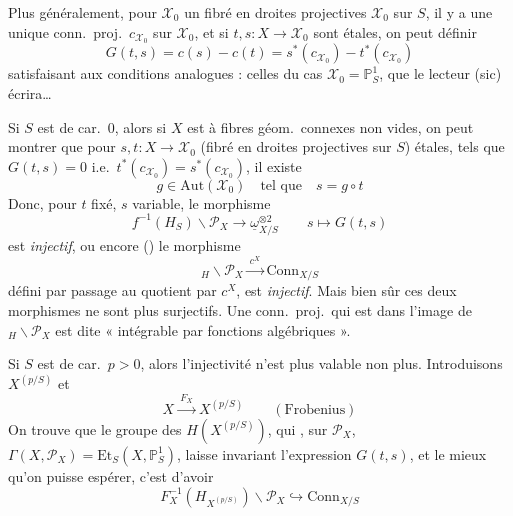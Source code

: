 \documentclass[11pt,a4paper]{article}
\begin{document}
Plus généralement, pour $\mathcal{X}_0$ un fibré en droites projectives $\mathcal{X}_0$ sur $S$, il y a une unique conn.\ proj.\ $c_{\mathcal{X}_0}$ sur $\mathcal{X}_0$, et si $t,s:X\to\mathcal{X}_0$ sont étales, on peut définir
\[
G(t,s)=c(s)-c(t)=s^*(c_{\mathcal{X}_0})-t^*(c_{\mathcal{X}_0})
\]
satisfaisant aux conditions analogues : celles du cas $\mathcal{X}_0=\mathbb{P}^1_S$, que le lecteur (sic) écrira…

Si $S$ est de car.\ $0$, alors si $X$ est  à fibres géom.\ connexes non vides, on peut montrer que pour $s,t:X\to\mathcal{X}_0$ (fibré en droites projectives sur $S$) étales, tels que $G(t,s)=0$ i.e.\ $t^*(c_{\mathcal{X}_0})=s^*(c_{\mathcal{X}_0})$, il existe
\[
g\in\mathrm{Aut}(\mathcal{X}_0)\quad\text{tel que}\quad s=g\circ t
\]
Donc, pour $t$ fixé, $s$ variable, le morphisme
\[
f^{-1}(H_S)\backslash\mathcal{P}_X\to\underline{\omega}^{\otimes2}_{X/S}\qquad s\longmapsto G(t,s)
\]
est \emph{injectif}, ou encore () le morphisme
\[
{}_H\backslash\mathcal{P}_X\xrightarrow{\ c^X\ }\mathrm{Conn}_{X/S}
\]
défini par passage au quotient par $c^X$, est \emph{injectif}. \struck{\ill{}} Mais bien sûr ces deux morphismes ne sont plus  surjectifs. Une conn.\ proj.\ qui est  dans l'image de ${}_H\backslash\mathcal{P}_X$ est dite « intégrable par fonctions algébriques ».

Si $S$ est de car.\ $p>0$, alors l'injectivité n'est plus valable non plus. Introduisons $X^{(p/S)}$ et
\[
X\xrightarrow{\ F_X\ }X^{(p/S)}\qquad(\text{Frobenius})
\]
On trouve que \struck{\ill{} \ill{} \ill{}} le groupe des $H(X^{(p/S)})$, qui  , sur $\mathcal{P}_X$, $\Gamma(X,\mathcal{P}_X)=\mathrm{Et}_S(X,\mathbb{P}^1_S)$, laisse invariant l'expression $G(t,s)$, et le mieux qu'on puisse espérer, c'est d'avoir
\[
F_X^{-1}(H_{X^{(p/S)}})\backslash\mathcal{P}_X\hookrightarrow\mathrm{Conn}_{X/S}
\]
\end{document}
